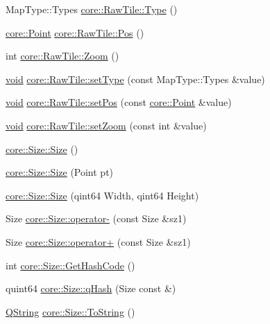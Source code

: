 \begin{DoxyCompactItemize}
\item 
\-Map\-Type\-::\-Types \hyperlink{group___o_p_map_widget_gab7a1ec0019fc105d9691bb2f0465f6b1}{core\-::\-Raw\-Tile\-::\-Type} ()
\item 
\hyperlink{structcore_1_1_point}{core\-::\-Point} \hyperlink{group___o_p_map_widget_ga1c62f80ba95a32840e72ccfa745f503f}{core\-::\-Raw\-Tile\-::\-Pos} ()
\item 
int \hyperlink{group___o_p_map_widget_gabd1ed75e92f807c70de10034d9d5dda4}{core\-::\-Raw\-Tile\-::\-Zoom} ()
\item 
\hyperlink{group___u_a_v_objects_plugin_ga444cf2ff3f0ecbe028adce838d373f5c}{void} \hyperlink{group___o_p_map_widget_gaa1c1e525ae0bd6aa39e0d3535cb696c8}{core\-::\-Raw\-Tile\-::set\-Type} (const \-Map\-Type\-::\-Types \&value)
\item 
\hyperlink{group___u_a_v_objects_plugin_ga444cf2ff3f0ecbe028adce838d373f5c}{void} \hyperlink{group___o_p_map_widget_ga1c6d9581bee67f1fd163df34471594da}{core\-::\-Raw\-Tile\-::set\-Pos} (const \hyperlink{structcore_1_1_point}{core\-::\-Point} \&value)
\item 
\hyperlink{group___u_a_v_objects_plugin_ga444cf2ff3f0ecbe028adce838d373f5c}{void} \hyperlink{group___o_p_map_widget_ga74673bcbb15e8d7c09ef6e909d40a813}{core\-::\-Raw\-Tile\-::set\-Zoom} (const int \&value)
\item 
\hyperlink{group___o_p_map_widget_gaf57b3247af9a9399f85615e6ad8a6981}{core\-::\-Size\-::\-Size} ()
\item 
\hyperlink{group___o_p_map_widget_ga03e339782ac393b92ad72e1d850589f6}{core\-::\-Size\-::\-Size} (\-Point pt)
\item 
\hyperlink{group___o_p_map_widget_gab8baf4ac21066099566fc15ba5f9542d}{core\-::\-Size\-::\-Size} (qint64 \-Width, qint64 \-Height)
\item 
\-Size \hyperlink{group___o_p_map_widget_ga5d0fdc38eda28a8c6bb71c421cb18150}{core\-::\-Size\-::operator-\/} (const \-Size \&sz1)
\item 
\-Size \hyperlink{group___o_p_map_widget_gacede8c8f61fa4e8ab03f0780af61b66b}{core\-::\-Size\-::operator+} (const \-Size \&sz1)
\item 
int \hyperlink{group___o_p_map_widget_ga8e9b3c1ccd7f2e2d5a6f9c4767c06043}{core\-::\-Size\-::\-Get\-Hash\-Code} ()
\item 
quint64 \hyperlink{group___o_p_map_widget_ga1f7482f21c86bc1b02f1e6d8ab2de12c}{core\-::\-Size\-::q\-Hash} (\-Size const \&)
\item 
\hyperlink{group___u_a_v_objects_plugin_gab9d252f49c333c94a72f97ce3105a32d}{\-Q\-String} \hyperlink{group___o_p_map_widget_ga69bf932485cc775bf1cd98d26961ebab}{core\-::\-Size\-::\-To\-String} ()

\end{DoxyCompactItemize}

